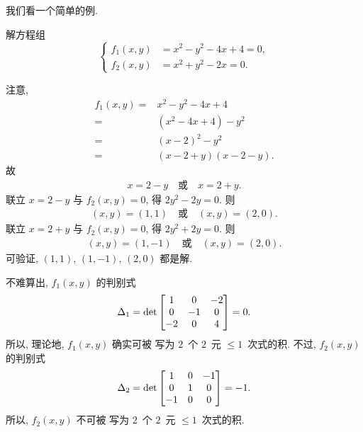 \documentclass[../libro.tex]{subfiles}
\begin{document}
我们看一个简单的例.

\begin{example}
    解方程组
    \begin{equation*}
        \left\{ %
        \begin{aligned}
            f_1 (x, y) & = x^2 - y^2 - 4x + 4 = 0, \\
            f_2 (x, y) & = x^2 + y^2 - 2x = 0.
        \end{aligned}
        \right. %
    \end{equation*}

    注意,
    \begin{align*}
        f_1 (x, y)
        = {} & x^2 - y^2 - 4x + 4      \\
        = {} & (x^2 - 4x + 4) - y^2    \\
        = {} & (x - 2)^2 - y^2         \\
        = {} & (x - 2 + y)(x - 2 - y).
    \end{align*}
    故
    \begin{align*}
        x = 2 - y
        \quad \text{或} \quad
        x = 2 + y.
    \end{align*}
    联立 \(x = 2 - y\) 与 \(f_2 (x, y) = 0\),
    得 \(2y^2 - 2y = 0\).
    则
    \begin{align*}
        (x, y) = (1, 1)
        \quad \text{或} \quad
        (x, y) = (2, 0).
    \end{align*}
    联立 \(x = 2 + y\) 与 \(f_2 (x, y) = 0\),
    得 \(2y^2 + 2y = 0\).
    则
    \begin{align*}
        (x, y) = (1, -1)
        \quad \text{或} \quad
        (x, y) = (2, 0).
    \end{align*}
    可验证, \((1, 1)\), \((1, -1)\), \((2, 0)\) 都是解.

    不难算出, \(f_1 (x, y)\) 的判别式
    \begin{align*}
        \Delta_1
        =
         \det
        \begin{bmatrix}
            1  & 0  & -2 \\
            0  & -1 & 0  \\
            -2 & 0  & 4  \\
        \end{bmatrix} 
        = 0.
    \end{align*}
    所以, 理论地, \(f_1 (x, y)\) 确实可被%
    写为 \(2\)~个 \(2\)~元 \({\leq} 1\)~次式的积.
    不过, \(f_2 (x, y)\) 的判别式
    \begin{align*}
        \Delta_2
        =
         \det
        \begin{bmatrix}
            1  & 0 & -1 \\
            0  & 1 & 0  \\
            -1 & 0 & 0  \\
        \end{bmatrix} 
        = -1.
    \end{align*}
    所以, \(f_2 (x, y)\) 不可被%
    写为 \(2\)~个 \(2\)~元 \({\leq} 1\)~次式的积.
\end{example}
\end{document}
